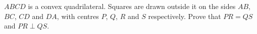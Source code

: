 $ABCD$ is a convex quadrilateral. Squares are drawn outside it on the sides $AB$, $BC$, $CD$ and $DA$, with centres $P$, $Q$, $R$ and $S$ respectively. Prove that $PR=QS$ and $PR\perp QS$.

